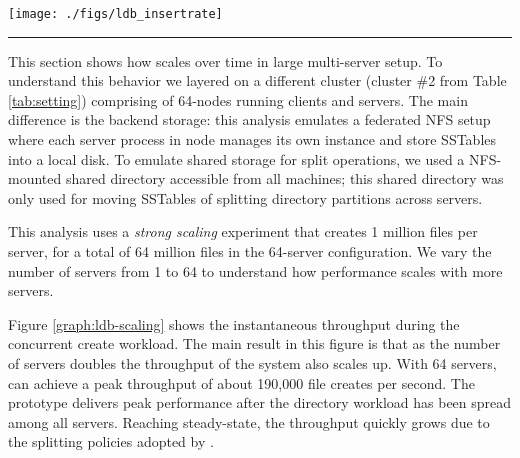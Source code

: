 \begin{figure*}[t]
\centerline{\texttt{[image: ./figs/ldb\_insertrate]}}
\vspace{10pt}
\caption{\textit{\footnotesize 
Our middleware metadata service prototype shows promising scalability
up to 64 servers.
Note that at the end of the experiment,
the throughput drops to zero
because clients stop creating files as they finish 1 million files per client.
(Solid lines are Bezier curves to smooth the variability.)
}
}
\hrule
\label{graph:ldb-scaling}
\end{figure*}

This section shows how \sys scales over time in large multi-server setup. To
understand this behavior we layered \sys on a different cluster (cluster \#2
from Table \ref{tab:setting}) comprising of 64-nodes running \sys clients and
servers. The main difference is the backend storage: this analysis emulates a
federated NFS setup where each \psys server process in node manages its own \tfs 
instance and store SSTables into a local disk.
To emulate shared storage for split operations, we used a NFS-mounted shared 
directory accessible from all machines; this shared directory was only used for 
moving SSTables of splitting directory partitions across servers.

This analysis uses a \textit{strong scaling} experiment that creates
1 million files per server, for a total of 64 million files in the
64-server configuration. We vary the number of servers from 1 to 64
to understand how performance scales with more servers.

Figure \ref{graph:ldb-scaling} shows the instantaneous throughput
during the concurrent create workload.
The main result in this figure is that as the number of servers doubles the
throughput of the system also scales up. With 64 servers, \giga can achieve a
peak throughput of about 190,000 file creates per second.
The prototype delivers peak performance after the directory workload
has been spread among all servers.
Reaching steady-state, the throughput quickly grows
due to the splitting policies adopted by \giga.


